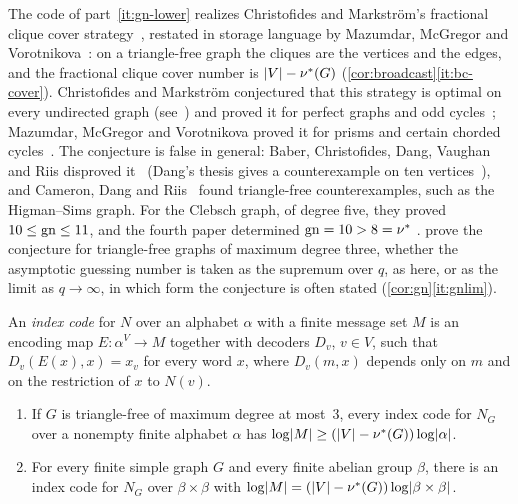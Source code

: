 The code of part~\ref{it:gn-lower} realizes Christofides and Markström's fractional clique cover
strategy~\cite{ChristofidesMarkstrom2011}, restated in storage language by Mazumdar, McGregor and
Vorotnikova~\cite{MMV2019}: on a triangle-free graph the cliques are the vertices and the edges, and the fractional clique
cover number is $\lvert V \rvert-\nu^{*}(G)$ (\cref{cor:broadcast}\ref{it:bc-cover}). Christofides and Markström conjectured
that this strategy is optimal on every undirected graph (see~\cite[Conjecture~1]{Dang2015}) and proved it for perfect
graphs and odd cycles~\cite{ChristofidesMarkstrom2011}; Mazumdar, McGregor and Vorotnikova proved it for prisms and
certain chorded cycles~\cite{MMV2019}. The conjecture is false in general: Baber, Christofides, Dang, Vaughan and Riis disproved
it~\cite{Baber2017} (Dang's thesis gives a counterexample on ten vertices~\cite[Section~4.1]{Dang2015}), and Cameron, Dang
and Riis~\cite{CameronDangRiis2016} found triangle-free counterexamples, such as the Higman--Sims graph. For the Clebsch
graph, of degree five, they proved $10\le\mathrm{gn}\le11$, and the fourth paper determined $\mathrm{gn}=10>8=\nu^{*}$
\cite[Corollary~6.11]{FourthPaper2026}.  prove the conjecture for triangle-free graphs of maximum
degree three, whether the asymptotic guessing number is taken as the supremum over $q$, as here, or as the limit as
$q\to\infty$, in which form the conjecture is often stated (\cref{cor:gn}\ref{it:gnlim}).

\begin{definition}\label{def:indexcode}
An \emph{index code} for $N$ over an alphabet $\alpha$ with a finite message set $M$ is an encoding map $E\colon\alpha^V\to M$
together with decoders $D_v$, $v\in V$, such that $D_v(E(x),x)=x_v$ for every word $x$, where $D_v(m,x)$ depends only on
$m$ and on the restriction of $x$ to $N(v)$.
\end{definition}

\begin{theorem}\label{thm:index}
\begin{enumerate}[label=(\alph*)]
\item If $G$ is triangle-free of maximum degree at most~$3$, every index code for $N_G$ over a nonempty finite alphabet
$\alpha$ has $\log\lvert M \rvert\ge(\lvert V \rvert-\nu^{*}(G))\log\lvert \alpha \rvert$.
\item For every finite simple graph $G$ and every finite abelian group $\beta$, there is an index code for $N_G$ over
$\beta\times\beta$ with $\log\lvert M \rvert=(\lvert V \rvert-\nu^{*}(G))\log\lvert \beta\times\beta \rvert$.
\end{enumerate}
\end{theorem}

